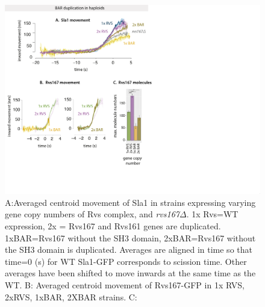 	\begin{figure}
	\centering
	\includegraphics[width=23cm,height=23 cm,keepaspectratio]{figures/results_final/scaffolding_overlaid2}
	\caption [Progression of invagination with increasing BAR recruitment]
	{A:Averaged centroid movement of Sla1 in strains expressing varying gene copy numbers of Rvs complex, and \textit{rvs167$\Delta$}. 1x Rvs=WT expression, 2x = Rvs167 and Rvs161 genes are duplicated. 1xBAR=Rvs167 without the SH3 domain, 2xBAR=Rvs167 without the SH3 domain is duplicated. Averages are aligned in time so that time=0 (s) for WT Sla1-GFP corresponds to scission time. Other averages have been shifted to move inwards at the same time as the WT.
	B: Averaged centroid movement of Rvs167-GFP in 1x RVS, 2xRVS, 1xBAR, 2XBAR strains.
	C:  }
	\end{figure}

